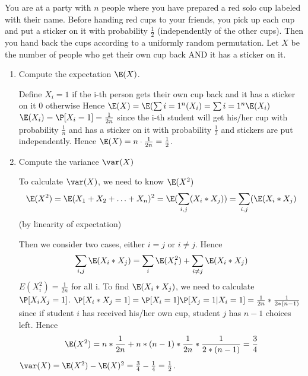 \question You are at a party with $n$ people where you have prepared a 
red solo cup labeled with their name. Before handing red cups to your 
friends, you pick up each cup and put a sticker on it with probability 
$\frac{1}{2}$ (independently of the other cups). Then you hand back the 
cups according to a uniformly random permutation. Let $X$ be the number 
of people who get their own cup back AND it has a sticker on it.
\begin{enumerate}[label=(\alph*)]
\item Compute the expectation $\E(X)$.
        \begin{solution}[3cm]
Define $X_i =     1$ if the i-th person gets their own cup back and it 
has a sticker on it 0 otherwise 
Hence $\E(X) = \E(\sum{i=1^n}(X_i) = \sum{i=1^n} \E(X_i) $
$\E(X_i) = \P[X_i = 1] = \frac{1}{2n}$ since the i-th student will get 
his/her cup with probability $\frac{1}{n}$ and has a sticker on it with 
probability $\frac{1}{2}$ and stickers are put independently. 
Hence $\E(X) = n \cdot \frac{1}{2n} = \frac{1}{2}$.
\end{solution}

\item Compute the variance $\var(X)$
    \begin{solution}[6cm]
To calculate $\var(X)$, we need to know $\E(X^2)$
\begin{equation*}
\E(X^2) = \E (X_1 + X_2 + \dotsc + X_n)^2  = \E(\sum_{i, j}(X_i * X_j) ) = 
\sum_{i,j} (\E(X_i * X_j )
\end{equation*} (by linearity of expectation) 

Then we consider two cases, either $i = j$ or $i \neq j.$ 
Hence 
\begin{equation*}
\sum_{i,j} \E(X_i * X_j) = \sum_{i} \E(X_i^2) + \sum_ {i \neq j} \E(X_i * X_j ) 
\end{equation*}
$E(X_i^2) = \frac{1}{2n}$ for all i. 
To find $\E(X_i * X_j  )$, we need to calculate $\P[X_iX_j = 1]$. 
$\P[X_i * X_j  = 1] = \P[X_i = 1] \P[X_j = 1 | X_i = 1] = \frac{1}{2n} * \frac{1}{2 * (n-1)}$ since if student $i$ has received his/her own cup, student $j$ has $n - 1$ choices left. 
Hence 
\begin{equation*}
\E(X^2 ) = n * \frac{1}{2n} + n * (n - 1) * \frac{1}{2n} * \frac{1}{2 * (n-1)}= 
\frac{3}{4}
\end{equation*}
$\var(X) = \E(X^2 ) - \E(X)^2 = \frac{3}{4} - \frac{1}{4} = \frac{1}{2} $.
\end{solution}
\end{enumerate}